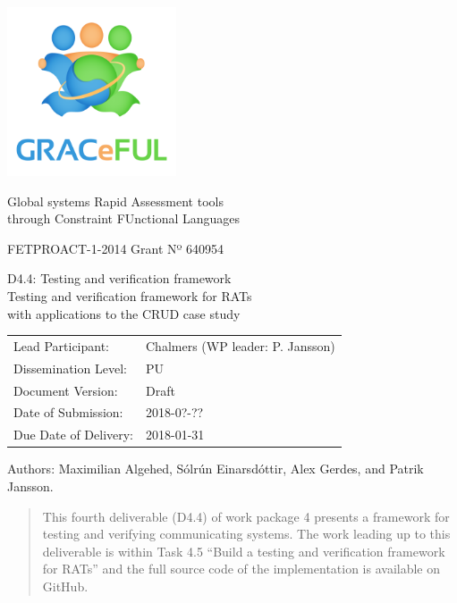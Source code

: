 \documentclass{article}
\author{}
\date{}
\begin{document}
\begin{center}
\includegraphics[width=5cm]{../coverpage/GRACeFULlogo.png}

\textcolor{GRACeFULblue}{Global systems Rapid Assessment tools\\
through Constraint FUnctional Languages}

\vspace{1cm}

FETPROACT-1-2014 Grant Nº 640954

\end{center}

\begin{framed}
\begin{center}
\Large
D4.4: Testing and verification framework\\[1ex]

\large
Testing and verification framework for RATs\\
with applications to the CRUD case study\\[1ex]

\end{center}
\end{framed}

\vspace{1cm}

\noindent
\begin{tabular}{@{}ll@{}}
  Lead Participant:       & Chalmers (WP leader: P. Jansson)
\\Dissemination Level:    & PU
\\Document Version:       & Draft
\\Date of Submission:     & 2018-0?-??
\\Due Date of Delivery:   & 2018-01-31
\end{tabular}

Authors: Maximilian Algehed, Sólrún Einarsdóttir, Alex Gerdes, and
Patrik Jansson.

\begin{abstract}

This fourth deliverable (D4.4) of work package 4 presents a framework for
testing and verifying communicating systems.
%
The work leading up to this deliverable is within Task 4.5 ``Build a
testing and verification framework for RATs'' and the full source code
of the implementation is available on GitHub.

\end{abstract}
\newpage
\end{document}

